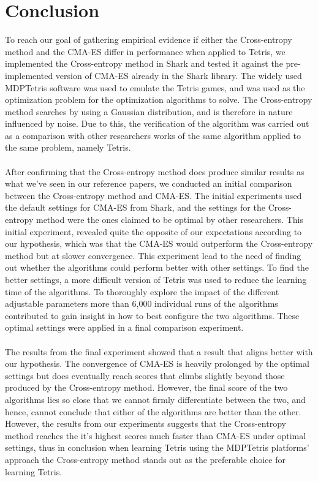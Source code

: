\section{Conclusion}

To reach our goal of gathering empirical evidence if either the Cross-entropy method
and the CMA-ES differ in performance when applied to Tetris, we implemented the Cross-entropy method in Shark and tested it against the pre-implemented version of CMA-ES
already in the Shark library. The widely used MDPTetris software was used to emulate the
Tetris games, and was used as the optimization problem for the optimization algorithms to solve.
The Cross-entropy method searches by using a Gaussian 
distribution, and is therefore in nature influenced by noise. Due to this, 
the verification of the algorithm was carried out as a comparison with other 
researchers works of the same algorithm applied to the same problem, namely Tetris.\\
\\
After confirming that the Cross-entropy method does produce similar results as 
what we've seen in our reference papers, we conducted an initial comparison between the
Cross-entropy method and CMA-ES. The initial experiments used the default settings for CMA-ES
from Shark,
and the settings for the Cross-entropy method were the ones claimed to be optimal by other 
researchers. This initial experiment, revealed quite the opposite of our expectations 
according to our hypothesis, which was that the CMA-ES would outperform the Cross-entropy method
but at slower convergence. This experiment lead to the need of finding out whether the algorithms
could perform better with other settings. To find the better settings, a more difficult version
of Tetris was used to reduce the learning time of the algorithms. To thoroughly explore 
the impact of the different adjustable parameters more than 6,000 individual runs of the 
algorithms contributed to gain insight in how to best configure the two algorithms. These 
optimal settings were applied in a final comparison experiment.\\
\\
The results from the final experiment showed that a result that aligns better with our
hypothesis. The convergence of CMA-ES is heavily prolonged by the optimal settings
but does eventually reach scores that climbs slightly beyond those produced by the
Cross-entropy method. However, the final score of the two algorithms lies so close that
we cannot firmly differentiate between the two, and hence, cannot conclude that either of the
algorithms are better than the other. However, the results from our experiments 
suggests that the Cross-entropy method reaches the 
it's highest scores much faster than CMA-ES under optimal settings, thus in conclusion
when learning Tetris using the MDPTetris platforms' approach the Cross-entropy method 
stands out as the preferable choice for learning Tetris.

